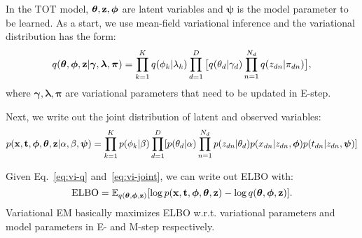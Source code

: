 \documentclass{article}
\newcommand{\gammav     }{\boldsymbol \gamma     }
\newcommand{\thetav     }{\boldsymbol \theta     }
\newcommand{\lambdav    }{\boldsymbol \lambda    }
\newcommand{\piv        }{\boldsymbol \pi        }
\newcommand{\phiv       }{\boldsymbol \phi       }
\newcommand{\psiv       }{\boldsymbol \psi       }
\begin{document}
In the TOT model, $\thetav, \zv, \phiv$ are latent variables and $\psiv$ is the model parameter to be learned. As a start, we use mean-field variational inference and the variational distribution has the form:
\begin{equation}
\label{eq:vi-q}
q(\thetav, \phiv, \zv | \gammav, \lambdav, \piv) = \prod_{k=1}^Kq(\phi_k|\lambda_k)\prod_{d=1}^D\big[q(\theta_d|\gamma_d)\prod_{n=1}^{N_d}q(\zdn|\pi_{dn})\big],
\end{equation}
where $\gammav, \lambdav, \piv$ are variational parameters that need to be updated in E-step.

Next, we write out the joint distribution of latent and observed variables:
\begin{equation}
\label{eq:vi-joint}
p(\xv, \tv, \phiv, \thetav, \zv | \alpha, \beta, \psiv) = \prodk p(\phi_k | \beta) \prodd[p(\theta_d | \alpha)\prodn p(\zdn | \theta_d)p(\xdn | \zdn, \phiv)p(\tdn | \zdn, \psiv)]
\end{equation}

Given Eq.~\ref{eq:vi-q} and~\ref{eq:vi-joint}, we can write out ELBO with:
\begin{equation}
\label{eq:vi-elbo}
\text{ELBO} = \Eb_{q(\thetav, \phiv, \zv)}[\log p(\xv, \tv, \phiv, \thetav, \zv) - \log q(\thetav, \phiv, \zv)].
\end{equation}
Variational EM basically maximizes ELBO w.r.t. variational parameters and model parameters in E- and M-step respectively.
\end{document}
